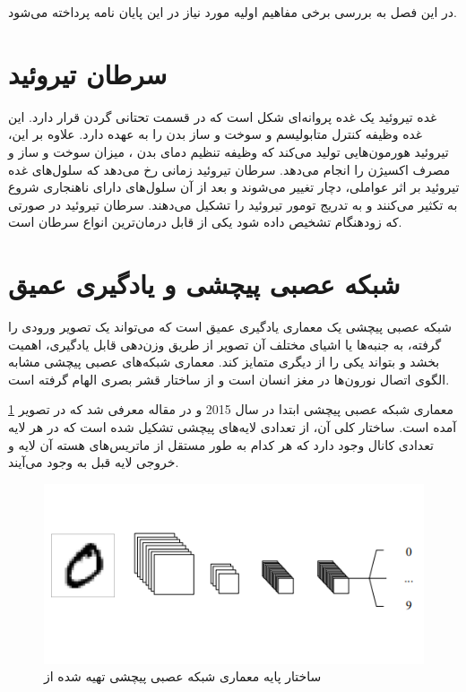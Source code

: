 در این فصل به بررسی برخی مفاهیم اولیه مورد نیاز در این پایان نامه پرداخته می‌شود.

\section{سرطان تیروئید}\label{sec:سرطان-تیروئید}
غده تیروئید یک غده پروانه‌ای شکل است که در قسمت تحتانی گردن قرار دارد.
این غده وظیفه کنترل متابولیسم و سوخت و ساز بدن را به عهده دارد.
علاوه بر این، تیروئید هورمون‌هایی تولید می‌کند که وظیفه تنظیم دمای بدن ، میزان سوخت و ساز و مصرف اکسیژن را انجام می‌دهد.
سرطان تیروئید زمانی رخ می‌دهد که سلول‌های غده تیروئید بر اثر عواملی، دچار تغییر می‌شوند و بعد از آن سلول‌های دارای ناهنجاری شروع به تکثیر می‌کنند و به تدریج تومور تیروئید را تشکیل می‌دهند.
سرطان تیروئید در صورتی که زودهنگام تشخیص داده شود یکی از قابل درمان‌ترین انواع سرطان است.







\section{شبکه عصبی پیچشی و یادگیری عمیق}\label{sec:شبکه عصبی پیچشی و یادگیری عمیق}
شبکه عصبی پیچشی یک معماری یادگیری عمیق است که می‌تواند یک تصویر ورودی را گرفته، به جنبه‌ها یا اشیای مختلف آن تصویر از طریق وزن‌دهی قابل یادگیری، اهمیت بخشد و بتواند یکی را از دیگری متمایز کند. معماری شبکه‌های عصبی پیچشی مشابه الگوی اتصال نورون‌ها در مغز انسان است و از ساختار قشر بصری الهام گرفته است.

معماری شبکه عصبی پیچشی ابتدا در سال 2015 و در مقاله \cite{o2015introduction} معرفی شد که در تصویر \ref{fig:cnnarchitecture} آمده است. ساختار کلی آن، از تعدادی لایه‌های پیچشی تشکیل شده است که در هر لایه تعدادی کانال وجود دارد که هر کدام به طور مستقل از ماتریس‌های هسته آن لایه و خروجی لایه قبل به وجود می‌آیند.
\begin{figure}
    \begin{center}
        \includegraphics[width=0.8\linewidth]{figs/basic_concepts/subs/cnn_image_processing/basic_cnn_arhitecture.PNG}
    \end{center}
    \caption[ساختار پایه معماری شبکه عصبی پیچشی]{ساختار پایه معماری شبکه عصبی پیچشی تهیه شده از \cite{o2015introduction}}
    \label{fig:cnnarchitecture}
\end{figure}

